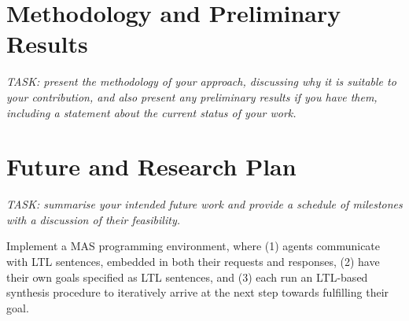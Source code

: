 \documentclass[conference]{IEEEtran}
\begin{document}
\section{Methodology and Preliminary Results}

\emph{TASK: present the methodology of your approach, discussing why
it is suitable to your contribution, and also present any preliminary
results if you have them, including a statement about the current
status of your work.}

\section{Future and Research Plan}

\emph{TASK: summarise your intended future work and provide a schedule
of milestones with a discussion of their feasibility.}

Implement a MAS programming environment, where (1) agents communicate
with LTL sentences, embedded in both their requests and responses, (2)
have their own goals specified as LTL sentences, and (3) each run an
LTL-based synthesis procedure to iteratively arrive at the next step
towards fulfilling their goal.



\end{document}
